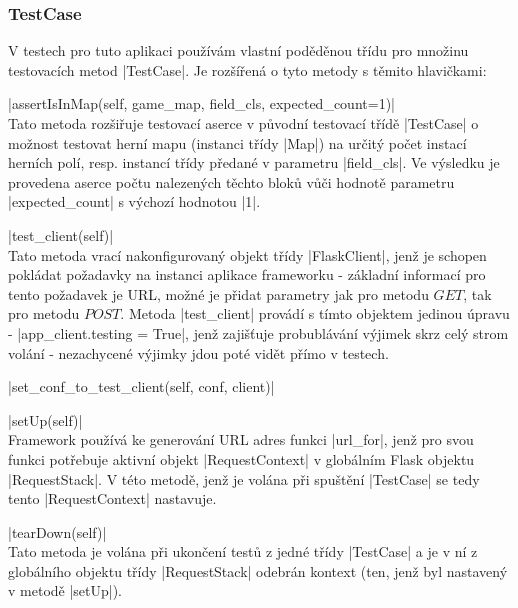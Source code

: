 \subsubsection{TestCase}

V testech pro tuto aplikaci používám vlastní poděděnou třídu pro množinu testovacích metod \ic|TestCase|. Je rozšířená o tyto metody s těmito hlavičkami:
\begin{description}
	\item \ic|assertIsInMap(self, game_map, field_cls, expected_count=1)| \\
	Tato metoda rozšiřuje testovací aserce v původní testovací třídě \ic|TestCase| o možnost testovat herní mapu (instanci třídy \ic|Map|) na určitý počet instací herních polí, resp. instancí třídy předané v parametru \ic|field_cls|. Ve výsledku je provedena aserce počtu nalezených těchto bloků vůči hodnotě parametru \ic|expected_count| s výchozí hodnotou \ic|1|.
	
    \item \ic|test_client(self)| \\
    Tato metoda vrací nakonfigurovaný objekt třídy \ic|FlaskClient|, jenž je schopen pokládat požadavky na instanci aplikace frameworku  - základní informací pro tento požadavek je URL, možné je přidat parametry jak pro  metodu $GET$, tak pro metodu $POST$. Metoda \ic|test_client| provádí s tímto objektem jedinou úpravu - \ic|app_client.testing = True|, jenž zajišťuje probublávání výjimek skrz celý strom volání - nezachycené výjimky jdou poté vidět přímo v testech.

    \item \ic|set_conf_to_test_client(self, conf, client)| \\

    \item \ic|setUp(self)| \\
    Framework  používá ke generování URL adres funkci \ic|url_for|, jenž pro svou funkci potřebuje aktivní objekt \ic|RequestContext| v globálním Flask objektu  \ic|RequestStack|. V této metodě, jenž je volána při spuštění \ic|TestCase| se tedy tento \ic|RequestContext| nastavuje. 

    \item \ic|tearDown(self)| \\
    Tato metoda je volána při ukončení testů z jedné třídy \ic|TestCase| a je v ní z globálního objektu třídy \ic|RequestStack| odebrán kontext (ten, jenž byl nastavený v metodě \ic|setUp|).

\end{description}
